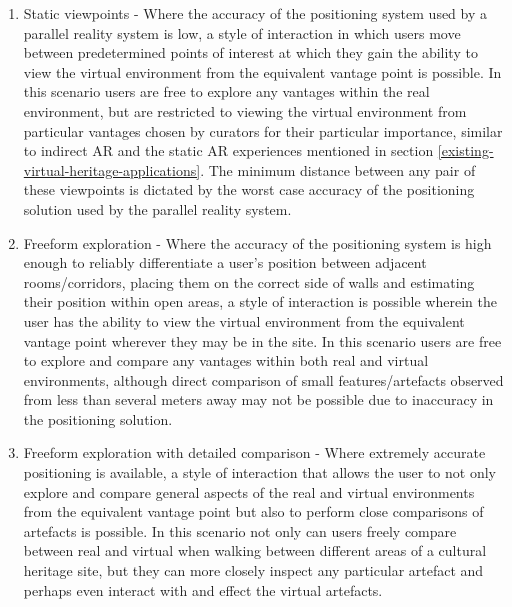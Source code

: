 \begin{enumerate}
	\item Static viewpoints - Where the accuracy of the positioning system used by a parallel reality system is low, a style of interaction in which users move between predetermined points of interest at which they gain the ability to view the virtual environment from the equivalent vantage point is possible. In this scenario users are free to explore any vantages within the real environment, but are restricted to viewing the virtual environment from particular vantages chosen by curators for their particular importance, similar to indirect AR and the static AR experiences mentioned in section \ref{existing-virtual-heritage-applications}. The minimum distance between any pair of these viewpoints is dictated by the worst case accuracy of the positioning solution used by the parallel reality system.
	
	\item Freeform exploration - Where the accuracy of the positioning system is high enough to reliably differentiate a user's position between adjacent rooms/corridors, placing them on the correct side of walls and estimating their position within open areas, a style of interaction is possible wherein the user has the ability to view the virtual environment from the equivalent vantage point wherever they may be in the site. In this scenario users are free to explore and compare any vantages within both real and virtual environments, although direct comparison of small features/artefacts observed from less than several meters away may not be possible due to inaccuracy in the positioning solution.
	
	\item Freeform exploration with detailed comparison - Where extremely accurate positioning is available, a style of interaction that allows the user to not only explore and compare general aspects of the real and virtual environments from the equivalent vantage point but also to perform close comparisons of artefacts is possible. In this scenario not only can users freely compare between real and virtual when walking between different areas of a cultural heritage site, but they can more closely inspect any particular artefact and perhaps even interact with and effect the virtual artefacts.
\end{enumerate}


